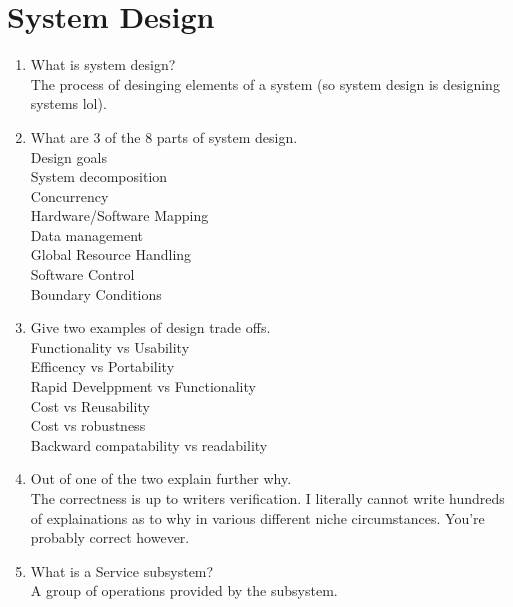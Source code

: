 \documentclass[10pt]{article}
\begin{document}
\section{System Design}
\begin{enumerate}
      \item What is system design?\\
            The process of desinging elements of a system (so system design is designing systems lol).\\

      \item What are 3 of the 8 parts of system design.\\
            Design goals\\
            System decomposition\\
            Concurrency\\
            Hardware/Software Mapping\\
            Data management\\
            Global Resource Handling\\
            Software Control\\
            Boundary Conditions\\

      \item Give two examples of design trade offs.\\
            Functionality vs Usability\\
            Efficency vs Portability\\
            Rapid Develppment vs Functionality\\
            Cost vs Reusability\\
            Cost vs robustness\\
            Backward compatability vs readability\\

      \item Out of one of the two explain further why.\\
            The correctness is up to writers verification. I literally cannot write hundreds of explainations as to why in
            various different niche circumstances. You're probably correct however.\\

      \item What is a Service subsystem?\\
            A group of operations provided by the subsystem.\\


\end{enumerate}
\end{document}
